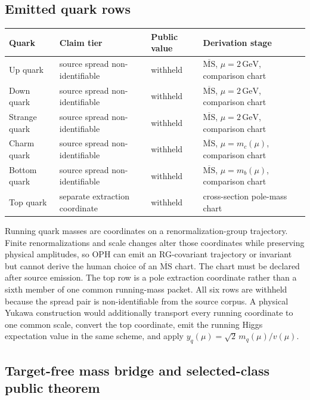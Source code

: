 \documentclass[11pt]{article}
\begin{document}
\subsection{Emitted quark rows}

\begin{table}[h]
\centering
\small
\begin{tabular}{@{}llll@{}}
\toprule
Quark & Claim tier & Public value & Derivation stage \\
\midrule
Up quark & source spread non-identifiable & withheld & \(\overline{\mathrm{MS}}\), \(\mu=2\,\mathrm{GeV}\), comparison chart \\
Down quark & source spread non-identifiable & withheld & \(\overline{\mathrm{MS}}\), \(\mu=2\,\mathrm{GeV}\), comparison chart \\
Strange quark & source spread non-identifiable & withheld & \(\overline{\mathrm{MS}}\), \(\mu=2\,\mathrm{GeV}\), comparison chart \\
Charm quark & source spread non-identifiable & withheld & \(\overline{\mathrm{MS}}\), \(\mu=m_c(\mu)\), comparison chart \\
Bottom quark & source spread non-identifiable & withheld & \(\overline{\mathrm{MS}}\), \(\mu=m_b(\mu)\), comparison chart \\
Top quark & separate extraction coordinate & withheld & cross-section pole-mass chart \\
\bottomrule
\end{tabular}
\end{table}

Running quark masses are coordinates on a renormalization-group trajectory. Finite
renormalizations and scale changes alter those coordinates while preserving physical amplitudes,
so OPH can emit an RG-covariant trajectory or invariant but cannot derive the human choice of an
\(\overline{\mathrm{MS}}\) chart. The chart must be declared after source emission. The top row is
a pole extraction coordinate rather than a sixth member of one common running-mass packet. All six
rows are withheld because the spread pair is non-identifiable from the source corpus. A physical
Yukawa construction would additionally transport every running coordinate to one common scale,
convert the top coordinate, emit the running Higgs expectation value in the same scheme, and apply
\(y_q(\mu)=\sqrt2\,m_q(\mu)/v(\mu)\).

\subsection{Target-free mass bridge and selected-class public theorem}\label{quark-family-strongest-overlap-branch-primitives}
\end{document}
